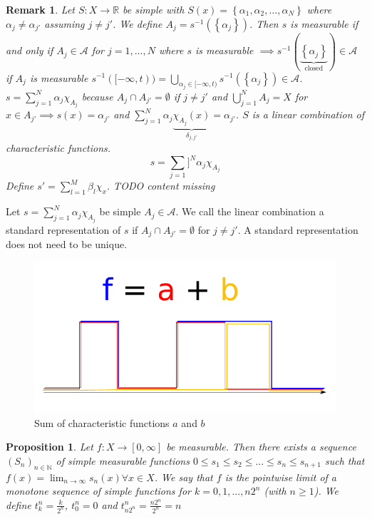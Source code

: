 \documentclass{article}
\newtheorem{remark}{Remark}  \numberwithin{remark}{section}
\newtheorem{proposition}{Proposition}  \numberwithin{proposition}{section}
\newcommand{\set}[1]{\left\{#1\right\}}
\begin{document}
\begin{remark}
  Let $S: X \to \mathbb R$ be simple with $S(x) = \set{\alpha_1, \alpha_2, \ldots, \alpha_N}$ where $\alpha_j \neq \alpha_{j'}$ assuming $j \neq j'$.
  We define $A_j = s^{-1}(\set{\alpha_j})$. Then $s$ is measurable if and only if $A_j \in \mathcal A$ for $j=1,\ldots,N$ where $s$ is measurable
  $\implies s^{-1}(\underbrace{\set{\alpha_j}}_{\text{closed}}) \in \mathcal A$ if $A_j$ is measurable $s^{-1}([-\infty, t)) = \bigcup_{\alpha_j \in [-\infty, t)} s^{-1}(\set{\alpha_j}) \in \mathcal A$.
  $s = \sum_{j=1}^N \alpha_j \chi_{A_j}$ because $A_j \cap A_{j'} = \emptyset$ if $j \neq j'$ and
  $\bigcup_{j=1}^N A_j = X$ for $x \in A_{j'} \implies s(x) = \alpha_{j'}$ and $\sum_{j=1}^N \alpha_j \underbrace{\chi_{A_j}(x)}_{\delta_{j,j'}} = \alpha_{j'}$.
  $S$ is a linear combination of characteristic functions.
  \[ s = \sum_{j=1}]^N \alpha_j \chi_{A_j} \]
  Define $s' = \sum_{l=1}^M \beta_l \chi_{x}$.
  TODO content missing
\end{remark}

Let $s = \sum_{j=1}^N \alpha_j \chi_{A_j}$ be simple $A_j \in \mathcal A$.
We call the linear combination a standard representation of $s$ if $A_j \cap A_{j'} = \emptyset$ for $j \neq j'$.
A standard representation does not need to be unique.

\begin{figure}[!h]
  \begin{center}
    \includegraphics{img/15_sum_of_characteristic_functions.pdf}
    \caption{Sum of characteristic functions $a$ and $b$}
  \end{center}
\end{figure}

\begin{proposition}
  Let $f: X \to [0, \infty]$ be measurable. Then there exists a sequence $(S_n)_{n \in \mathbb N}$ of simple measurable functions
  $0 \leq s_1 \leq s_2 \leq \ldots \leq s_n \leq s_{n+1}$ such that $f(x) = \lim_{n\to\infty} s_n(x) \forall x \in X$.
  We say that $f$ is the pointwise limit of a monotone sequence of simple functions for $k = 0,1,\ldots, n2^n$ (with $n \geq 1$).
  We define $t_k^n = \frac{k}{2^n}$, $t_0^n = 0$ and $t_{n2^n}^n = \frac{n2^n}{2^n} = n$
\end{proposition}
\end{document}
